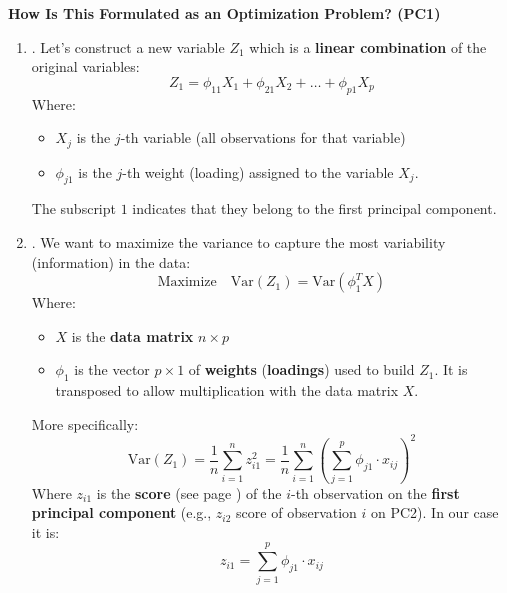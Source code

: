 \highspace
\begin{flushleft}
    \textcolor{Green3}{ \textbf{How Is This Formulated as an Optimization Problem? (PC1)}}
\end{flushleft}
\begin{enumerate}
    \item {}. Let's construct a new variable $Z_{1}$ which is a \textbf{linear combination} of the original variables:
    \begin{equation*}
        Z_{1} = \phi_{11} X_{1} + \phi_{21} X_{2} + \dots + \phi_{p1} X_{p}
    \end{equation*}
    Where:
    \begin{itemize}
        \item $X_{j}$ is the $j$-th variable (all observations for that variable)
        \item $\phi_{j1}$ is the $j$-th weight (loading) assigned to the variable $X_{j}$.
    \end{itemize}
    The subscript $1$ indicates that they belong to the first principal component.

    \item {}. We want to maximize the variance to capture the most variability (information) in the data:
    \begin{equation*}
        \text{Maximize} \hspace{1em} \text{Var}\left(Z_{1}\right) = \text{Var}\left(\phi_{1}^{T} X\right)
    \end{equation*}
    Where:
    \begin{itemize}
        \item $X$ is the \textbf{data matrix} $n \times p$
        \item $\phi_{1}$ is the vector $p \times 1$ of \textbf{weights} (\textbf{loadings}) used to build $Z_{1}$. It is transposed to allow multiplication with the data matrix $X$.
    \end{itemize}
    More specifically:
    \begin{equation*}
        \text{Var}\left(Z_{1}\right) = \dfrac{1}{n} \sum_{i=1}^{n} z_{i1}^2 = \dfrac{1}{n} \sum_{i=1}^{n} \left( \sum_{j=1}^{p} \phi_{j1} \cdot x_{ij} \right)^2
    \end{equation*}
    Where $z_{i1}$ is the \textbf{score} (see page \pageref{eq: scores}) of the $i$-th observation on the \textbf{first principal component} (e.g., $z_{i2}$ score of observation $i$ on PC2). In our case it is:
    \begin{equation*}
        z_{i1} = \displaystyle\sum_{j=1}^{p} \phi_{j1} \cdot x_{ij}
    \end{equation*}


\end{enumerate}
